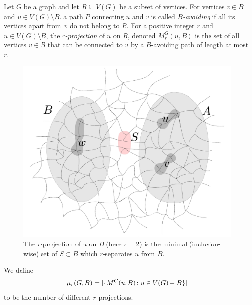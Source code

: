 Let $G$ be a graph and let $B\subseteq V(G)$ be a subset of vertices. For vertices $v\in B$ and $u\in V(G)\setminus B$, a path $P$ connecting $u$ and $v$ is called {\em{$B$-avoiding}}
if all its vertices apart from~$v$ do not belong to $B$. For a positive integer $r$ and $u\in V(G)\setminus B$, the {\em{$r$-projection}} of $u$ on $B$, denoted $M^G_r(u,B)$ is the set of all vertices $v\in B$ that
can be connected to $u$ by a $B$-avoiding path of length at most $r$. 
%
%
\begin{figure}[h!]
	\centering
		\includegraphics[scale=0.35,page=2]{pics}
	\caption{The  $r$-projection of $u$ on $B$
	(here $r=2$)
	is the minimal (inclusion-wise) set of $S\subset B$
	which $r$-separates $ u$ from $B$.
	}
	\label{fig:gaifman}
\end{figure}

We define 
\[\mu_r(G,B)=|\{M_r^G(u,B)\colon u\in V(G)- B\}|\]
to be the number of different $r$-projections.

